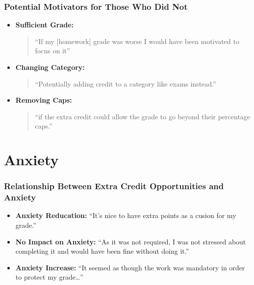 \documentclass{beamer}
\begin{document}
\begin{frame}
    \frametitle{Potential Motivators for Those Who Did Not}

    \begin{itemize}
      \item \textbf{Sufficient Grade:}\\
        \begin{quote}
          ``If my [homework] grade was worse I would have been motivated to focus on it''
        \end{quote}
      \item \textbf{Changing Category:}\\
        \begin{quote}
          ``Potentially adding credit to a category like exams instead.''
        \end{quote}
      \item \textbf{Removing Caps:}\\
        \begin{quote}
          ``if the extra credit could allow the grade to go beyond their percentage caps.''
        \end{quote}
    \end{itemize}


\end{frame}


\section{Anxiety}

\begin{frame}
    \frametitle{Relationship Between Extra Credit Opportunities and Anxiety}

    \begin{figure}
      
    \end{figure}

    \begin{itemize}
      \item \textbf{Anxiety Reducation:}
          ``It's nice to have extra points as a cusion for my grade.''
      \item \textbf{No Impact on Anxiety:}
          ``As it was not required, I was not stressed about completing it and would have been fine without doing it.''
      \item \textbf{Anxiety Increase:}
          ``It seemed as though the work was mandatory in order to protect my grade\ldots''
    \end{itemize}

\end{frame}
\end{document}
